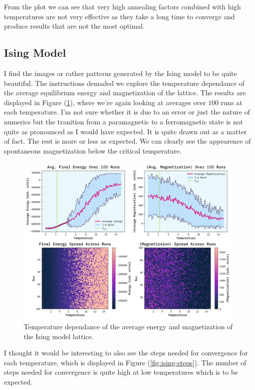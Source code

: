 \documentclass[10pt, titlepage, a4paper]{article}
\begin{document}
From the plot we can see that very high annealing factors combined with high temperatures are not very effective as they take a long time to
converge and produce results that are not the most optimal.

\subsection{Ising Model}
I find the images or rather patterns generated by the Ising model to be quite beautiful. The instructions demaded we explore the temperature
dependance of the average equilibrium energy and magnetization of the lattice. The results are displayed in Figure (\ref{fig:ising-energy-magnetization}), where 
we're again looking at averages over $100$ runs at each temperature. I'm not sure whether it is due to an error or just the nature of 
numerics but the tranition from a paramagnetic to a ferromagnetic state is not quite as pronounced as I would have expected. It is 
quite drawn out as a matter of fact. The rest is more or less as expected. We can clearly see the appearence of spontaneous 
magnetization below the critical temperature.

\begin{figure}[H]
    \centering
    \includegraphics[width=.95\textwidth]{../IsingModel/Images/avgE-avgS-vs-T-v2.png}
    \caption{Temperature dependance of the average energy and magnetization of the Ising model lattice.}
    \label{fig:ising-energy-magnetization}
\end{figure}

I thought it would be interesting to also see the steps needed for convergence for each temperature, which is displayed in Figure 
(\ref{fig:ising-steps}). The number of steps needed for convergence is quite high at low temperatures which is to be expected.
\end{document}
